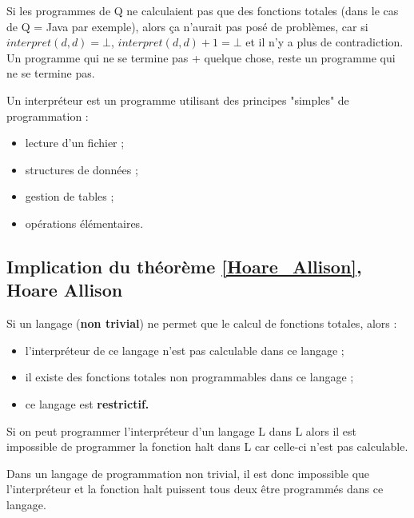 \begin{myrem}
	Si les programmes de Q ne calculaient pas que des fonctions totales (dans le cas de Q = Java par exemple), alors ça n'aurait pas posé de problèmes, car si $interpret(d,d)=\bot$, $interpret(d,d)+1=\bot$ et il n'y a plus de contradiction.  Un programme qui ne se termine pas + quelque chose, reste un programme qui ne se termine pas.
\end{myrem}

\begin{myrem}
Un interpréteur est un programme  utilisant des principes "simples" de programmation :
\begin{itemize}
    \item lecture d'un fichier ;
    \item structures de données ;
    \item gestion de tables ;
    \item opérations élémentaires.
\end{itemize}
\end{myrem}

\subsection[Implication du théorème de Hoare Allison]{Implication du théorème \ref{Hoare_Allison}, Hoare Allison}
\begin{myprop}
	Si un langage (\textbf{non trivial}) ne permet que le calcul de fonctions totales, alors :
	\begin{itemize}
		\item l'interpréteur de ce langage n'est pas calculable dans ce langage ;
		\item il existe des fonctions totales non programmables dans ce langage ;
		\item ce langage est \bf{restrictif}.
	\end{itemize}
\end{myprop}

\begin{myprop}
	Si on peut programmer l'interpréteur d'un langage L dans L alors il est
	impossible de programmer la fonction halt dans L car celle-ci n'est pas calculable.
\end{myprop}

\begin{myprop}
	Dans un langage de programmation non trivial, il est donc impossible que
	l'interpréteur et la fonction halt puissent tous deux être programmés dans ce langage.
\end{myprop}

